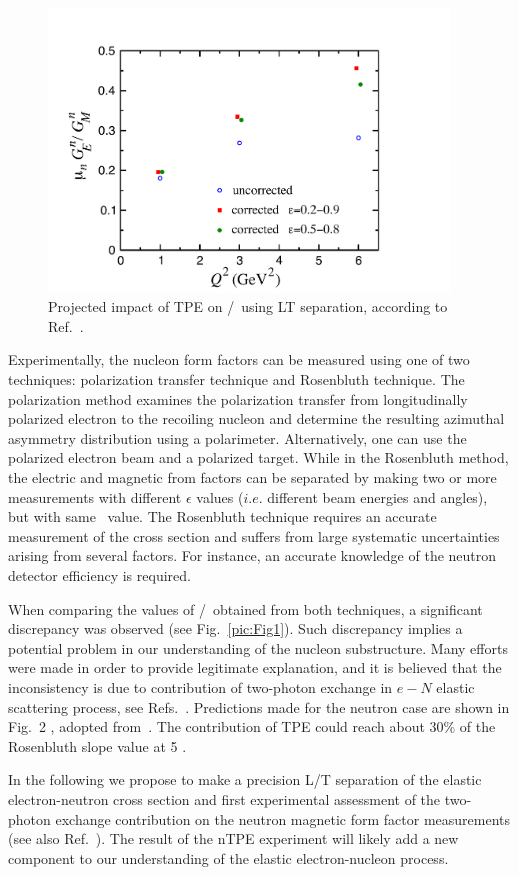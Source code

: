 \begin{figure}[th]
\includegraphics[width = 0.95\textwidth]{Plots/nTPE-BMT.pdf}
\caption{Projected impact of TPE on \gen/\gmn~using LT separation, according to Ref.~\cite{Blunden:2005ew}.}
\label{pic:Fig2}
\end{figure}
 
Experimentally, the nucleon form factors can be measured using one of two techniques: polarization transfer technique and Rosenbluth technique. 
The polarization method examines the polarization transfer from longitudinally polarized electron to the recoiling nucleon and 
determine the resulting azimuthal asymmetry distribution using a polarimeter. 
Alternatively, one can use the polarized  electron beam and a polarized target. 
While in the Rosenbluth method, the electric and magnetic from factors can be separated by making two or more measurements with 
different $\epsilon$ values ($i.e.$ different beam energies and angles), but with same \qsq~value. 
The Rosenbluth technique requires an accurate measurement of the cross section and suffers from large systematic uncertainties arising from several factors. 
For instance, an accurate knowledge of the neutron detector efficiency is required.

When comparing the values of \gep/\gmp~obtained from both techniques, a significant discrepancy was observed (see Fig.~\ref{pic:Fig1}). 
Such discrepancy implies a potential problem in our understanding of the nucleon substructure. 
Many efforts were made in order to provide legitimate explanation, and it is believed that the inconsistency is due to contribution of two-photon exchange
in $e-N$ elastic scattering process, see Refs.~\cite{Arrington:2011dn, Afanasev:2017gsk}.
Predictions made for the neutron case are shown in Fig.~2
, adopted from~\cite{Blunden:2005ew}.
The contribution of TPE could reach about 30\% of the Rosenbluth slope value at 5 \gevcsq.

In the following we propose to make a precision L/T separation of the elastic electron-neutron cross section and first experimental assessment 
of the two-photon exchange contribution on the neutron magnetic form factor measurements (see also Ref.~\cite{Wojtsekhowski:2017kti}).
The result of the nTPE experiment will likely add a new component to our understanding of the elastic electron-nucleon process.
